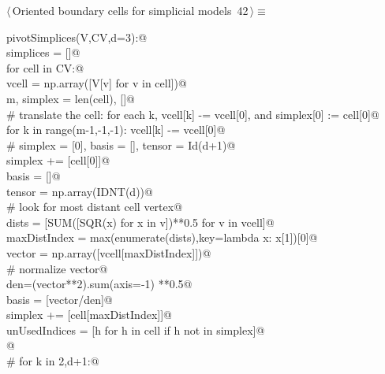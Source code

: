 \documentclass[11pt,oneside]{article}    %
\begin{document}
\begin{flushleft} \small \label{scrap68}
\protect{}$\langle\,$Oriented boundary cells for simplicial models\nobreak\ {\footnotesize 42}$\,\rangle\equiv$
\vspace{-1ex}
\begin{list}{}{} \item
\mbox{}\verb@def pivotSimplices(V,CV,d=3):@\\
\mbox{}\verb@    simplices = []@\\
\mbox{}\verb@    for cell in CV:@\\
\mbox{}\verb@        vcell = np.array([V[v] for v in cell])@\\
\mbox{}\verb@        m, simplex = len(cell), []@\\
\mbox{}\verb@        # translate the cell: for each k, vcell[k] -= vcell[0], and simplex[0] := cell[0]@\\
\mbox{}\verb@        for k in range(m-1,-1,-1): vcell[k] -= vcell[0]@\\
\mbox{}\verb@        # simplex = [0], basis = [], tensor = Id(d+1)@\\
\mbox{}\verb@        simplex += [cell[0]]@\\
\mbox{}\verb@        basis = []@\\
\mbox{}\verb@        tensor = np.array(IDNT(d))@\\
\mbox{}\verb@        # look for most distant cell vertex@\\
\mbox{}\verb@        dists = [SUM([SQR(x) for x in v])**0.5 for v in vcell]@\\
\mbox{}\verb@        maxDistIndex = max(enumerate(dists),key=lambda x: x[1])[0]@\\
\mbox{}\verb@        vector = np.array([vcell[maxDistIndex]])@\\
\mbox{}\verb@        # normalize vector@\\
\mbox{}\verb@        den=(vector**2).sum(axis=-1) **0.5@\\
\mbox{}\verb@        basis = [vector/den]@\\
\mbox{}\verb@        simplex += [cell[maxDistIndex]]@\\
\mbox{}\verb@        unUsedIndices = [h for h in cell if h not in simplex]@\\
\mbox{}\verb@        @\\
\mbox{}\verb@        # for k in {2,d+1}:@\\

\end{list}
\end{flushleft}
\end{document}
